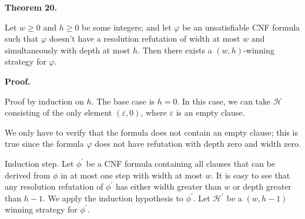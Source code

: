 \documentclass[10pt,a4paper]{article}
\begin{document}
\par\medskip\noindent\textbf{
Theorem 20.
}\par



Let $w\geq 0$ and $h\geq 0$ be some integers;
and let $\varphi$ be an unsatisfiable CNF formula such that $\varphi$ doesn’t have a resolution refutation of width
at most $w$ and simultaneously with depth at most $h$.
Then there exists a $(w,h)$-winning strategy for $\varphi$.\par



\par\medskip\noindent\textbf{Proof.}\par


Proof by induction on $h$. The base case is $h=0$. In this case, we can take $\mathcal{H}$ consisting of the only
element $(\varepsilon,0)$, where $\varepsilon$ is an empty clause.\par



We only have to verify that the formula does not contain an empty clause; this is true since the formula $\varphi$
does not have refutation with depth zero and width zero.\par



Induction step. Let $\phi^{\prime}$ be a CNF formula containing all clauses that can be derived from $\phi$ in at most one step with width at most $w$.
It is easy to see that any resolution refutation of $\phi^{\prime}$ has either width greater than $w$ or depth greater than $h-1$.
We apply the induction hypothesis to $\phi^{\prime}$. Let $\mathcal{H^{\prime}}$ be a $(w,h-1)$ winning strategy for $\phi^{\prime}$.\par
\end{document}
